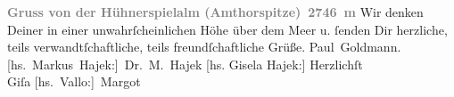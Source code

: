 \begin{ledgroupsized}[t]{13cm}
           \noindent{}\centering{}{\pb}\textcolor{gray}{\textbf{Gruss von der Hühnerspielalm (Amthorspitze) 2746 m}}\pend
           \pstart
           \noindent{}{\pb}Wir denken Deiner in einer unwahrſcheinlichen Höhe
               über dem Meer u. ſenden Dir herzliche, teils verwandtſchaftliche, teils
               freundſchaftliche Grüße. \spacefill\mbox{Paul Goldmann.}\pend
           \pstart
           \spacefill\mbox{{[}hs. Markus Hajek:{]} Dr. M. Hajek}\pend
           \pstart
           {[}hs. Gisela Hajek:{]} Herzlichſt {\\}\spacefill\mbox{Giſa}\pend
           \pstart
           \spacefill\mbox{{[}hs. Vallo:{]} Margot}\pend
           
         
         \endnumbering{}\end{ledgroupsized}  \newcommand{\dateiname}{L03459}\newcommand{\titel}{Paul Goldmann, Markus Hajek, Gisela Hajek und Margot Vallo an Arthur Schnitzler, [27. 8. 1907?]}\newcommand{\editorInnen}{Martin Anton Müller und Laura Untner}
      